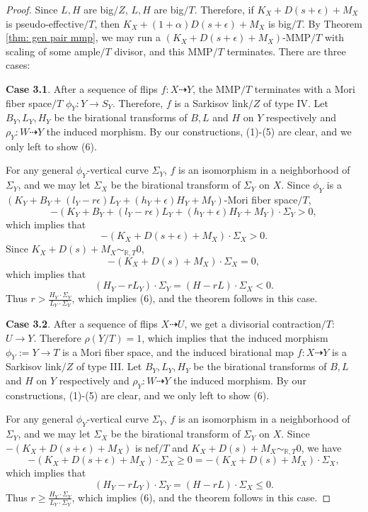 \documentclass[11pt]{amsart}
\numberwithin{equation}{section}
\newcommand{\Rr}{\mathbb{R}}
\theoremstyle{definition}
\theoremstyle{definition}
\theoremstyle{definition}
\begin{document}
\begin{proof}
Since $L,H$ are big$/Z$, $L,H$ are big$/T$. Therefore, if $K_{X}+D(s+\epsilon)+M_X$ is pseudo-effective$/T$, then $K_X+(1+\alpha)D(s+\epsilon)+M_X$ is big$/T$. By Theorem \ref{thm: gen pair mmp}, we may run a $(K_{X}+D(s+\epsilon)+M_X)$-MMP$/T$ with scaling of some ample$/T$ divisor, and this MMP$/T$ terminates. There are three cases:

\medskip


\noindent\textbf{Case 3.1}. After a sequence of flips $f: X\dashrightarrow Y$, the MMP$/T$ terminates with a Mori fiber space$/T$ $\phi_Y: Y\rightarrow S_Y$. Therefore, $f$ is a Sarkisov link$/Z$ of type IV.  Let $B_Y,L_Y,H_Y$ be the birational transforms of $B,L$ and $H$ on $Y$ respectively and $\rho_Y: W\dashrightarrow Y$ the induced morphism. By our constructions, (1)-(5) are clear, and we only left to show (6).

For any general $\phi_Y$-vertical curve $\Sigma_Y$, $f$ is an isomorphism in a neighborhood of $\Sigma_Y$, and we may let $\Sigma_X$ be the birational transform of $\Sigma_Y$ on $X$. Since $\phi_Y$ is a $(K_Y+B_Y+(l_Y-r\epsilon)L_Y+(h_Y+\epsilon)H_Y+M_Y)$-Mori fiber space$/T$, 
$$-(K_Y+B_Y+(l_Y-r\epsilon)L_Y+(h_Y+\epsilon)H_Y+M_Y)\cdot\Sigma_Y>0,$$
which implies that
$$-(K_X+D(s+\epsilon)+M_X)\cdot\Sigma_X>0.$$
Since $K_X+D(s)+M_X\sim_{\Rr,T}0$, 
$$-(K_X+D(s)+M_X)\cdot\Sigma_X=0,$$
which implies that 
$$(H_Y-rL_Y)\cdot\Sigma_Y=(H-rL)\cdot\Sigma_X<0.$$ 
Thus $r>\frac{H_Y\cdot\Sigma_Y}{L_Y\cdot\Sigma_Y}$, which implies (6), and the theorem follows in this case.

\medskip

\noindent\textbf{Case 3.2}. After a sequence of flips $X\dashrightarrow U$, we get a divisorial contraction$/T$: $U\rightarrow Y$. Therefore $\rho(Y/T)=1$, which implies that the induced morphism $\phi_Y:=Y\rightarrow T$ is a Mori fiber space, and the induced birational map $f: X\dashrightarrow Y$ is a Sarkisov link$/Z$ of type III. Let $B_Y,L_Y,H_Y$ be the birational transforms of $B,L$ and $H$ on $Y$ respectively and $\rho_Y: W\dashrightarrow Y$ the induced morphism. By our constructions, (1)-(5) are clear, and we only left to show (6).

For any general $\phi_Y$-vertical curve $\Sigma_Y$, $f$ is an isomorphism in a neighborhood of $\Sigma_Y$, and we may let $\Sigma_X$ be the birational transform of $\Sigma_Y$ on $X$. Since $-(K_X+D(s+\epsilon)+M_X)$ is nef$/T$ and $K_X+D(s)+M_X\sim_{\Rr,T}0$, we have
$$-(K_X+D(s+\epsilon)+M_X)\cdot\Sigma_X\geq 0=-(K_X+D(s)+M_X)\cdot\Sigma_X,$$
which implies that 
$$(H_Y-rL_Y)\cdot\Sigma_Y=(H-rL)\cdot\Sigma_X\leq 0.$$ 
Thus $r\geq\frac{H_Y\cdot\Sigma_Y}{L_Y\cdot\Sigma_Y}$, which implies (6), and the theorem follows in this case.


\end{proof}
\end{document}
